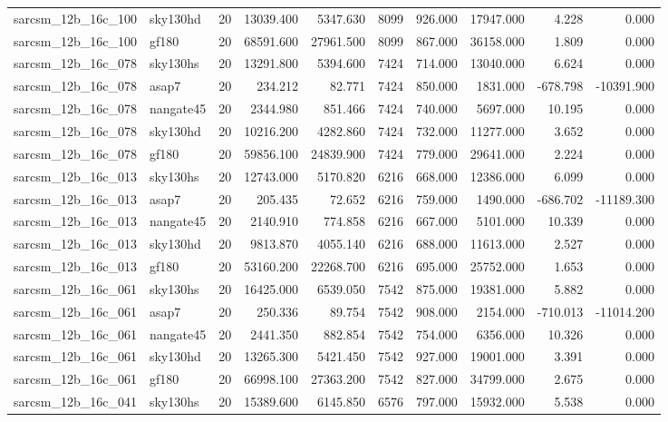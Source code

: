 \begin{longtable}{llrrrrrrrr}
sarcsm\_12b\_16c\_100 & sky130hd & 20 & 13039.400 & 5347.630 & 8099 & 926.000 & 17947.000 & 4.228 & 0.000 \\
sarcsm\_12b\_16c\_100 & gf180 & 20 & 68591.600 & 27961.500 & 8099 & 867.000 & 36158.000 & 1.809 & 0.000 \\
sarcsm\_12b\_16c\_078 & sky130hs & 20 & 13291.800 & 5394.600 & 7424 & 714.000 & 13040.000 & 6.624 & 0.000 \\
sarcsm\_12b\_16c\_078 & asap7 & 20 & 234.212 & 82.771 & 7424 & 850.000 & 1831.000 & -678.798 & -10391.900 \\
sarcsm\_12b\_16c\_078 & nangate45 & 20 & 2344.980 & 851.466 & 7424 & 740.000 & 5697.000 & 10.195 & 0.000 \\
sarcsm\_12b\_16c\_078 & sky130hd & 20 & 10216.200 & 4282.860 & 7424 & 732.000 & 11277.000 & 3.652 & 0.000 \\
sarcsm\_12b\_16c\_078 & gf180 & 20 & 59856.100 & 24839.900 & 7424 & 779.000 & 29641.000 & 2.224 & 0.000 \\
sarcsm\_12b\_16c\_013 & sky130hs & 20 & 12743.000 & 5170.820 & 6216 & 668.000 & 12386.000 & 6.099 & 0.000 \\
sarcsm\_12b\_16c\_013 & asap7 & 20 & 205.435 & 72.652 & 6216 & 759.000 & 1490.000 & -686.702 & -11189.300 \\
sarcsm\_12b\_16c\_013 & nangate45 & 20 & 2140.910 & 774.858 & 6216 & 667.000 & 5101.000 & 10.339 & 0.000 \\
sarcsm\_12b\_16c\_013 & sky130hd & 20 & 9813.870 & 4055.140 & 6216 & 688.000 & 11613.000 & 2.527 & 0.000 \\
sarcsm\_12b\_16c\_013 & gf180 & 20 & 53160.200 & 22268.700 & 6216 & 695.000 & 25752.000 & 1.653 & 0.000 \\
sarcsm\_12b\_16c\_061 & sky130hs & 20 & 16425.000 & 6539.050 & 7542 & 875.000 & 19381.000 & 5.882 & 0.000 \\
sarcsm\_12b\_16c\_061 & asap7 & 20 & 250.336 & 89.754 & 7542 & 908.000 & 2154.000 & -710.013 & -11014.200 \\
sarcsm\_12b\_16c\_061 & nangate45 & 20 & 2441.350 & 882.854 & 7542 & 754.000 & 6356.000 & 10.326 & 0.000 \\
sarcsm\_12b\_16c\_061 & sky130hd & 20 & 13265.300 & 5421.450 & 7542 & 927.000 & 19001.000 & 3.391 & 0.000 \\
sarcsm\_12b\_16c\_061 & gf180 & 20 & 66998.100 & 27363.200 & 7542 & 827.000 & 34799.000 & 2.675 & 0.000 \\
sarcsm\_12b\_16c\_041 & sky130hs & 20 & 15389.600 & 6145.850 & 6576 & 797.000 & 15932.000 & 5.538 & 0.000 \\

\end{longtable}
